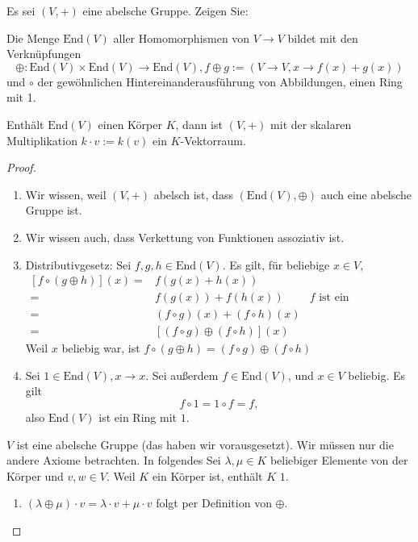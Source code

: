 \begin{Problem}
	Es sei $(V, +)$ eine abelsche Gruppe. Zeigen Sie:
	\begin{parts}
	\item Die Menge $\text{End}\left(V \right) $ aller Homomorphismen von $V\to V$ bildet mit den Verknüpfungen 
		\[
			\oplus: \text{End}(V)\times \text{End}(V)\to \text{End}(V), f\oplus g:=(V\to V, x\to f(x)+g(x))
		\]
		und $\circ$ der gewöhnlichen Hintereinanderausführung von Abbildungen, einen Ring mit 1.
	\item Enthält $\text{End}(V)$ einen Körper $K$, dann ist $(V,+)$ mit der skalaren Multiplikation $k\cdot v:=k(v)$ ein $K$-Vektorraum.
	\end{parts}
\end{Problem}
\begin{proof}
	\begin{parts}
	\item 
		\begin{enumerate}[label=(\roman*)]
			\item Wir wissen, weil $(V,+)$ abelsch ist, dass $(\text{End}(V),\oplus)$ auch eine abelsche Gruppe ist.
			\item Wir wissen auch, dass Verkettung von Funktionen assoziativ ist.
			\item Distributivgesetz: Sei $f,g,h\in \text{End}(V)$. Es gilt, f\"{u}r beliebige $x\in V$,
				\begin{align*}
					\left[f\circ (g\oplus h)\right](x)=& f(g(x)+h(x))\\
					=& f(g(x))+f(h(x)) & f\text{ ist ein Homomorphismus}\\
					=& (f\circ g)(x)+(f\circ h)(x)\\
					=&\left[ (f\circ g)\oplus (f\circ h) \right](x)
				\end{align*}
				Weil $x$ beliebig war, ist $f\circ (g\oplus h)=(f\circ g)\oplus(f\circ h)$
			\item Sei $1\in \text{End}(V), x\to x$. Sei außerdem $f\in \text{End}(V)$, und $x\in V$ beliebig. Es gilt
\[
f\circ 1=1\circ f =f
,\]
also $\text{End}(V)$ ist ein Ring mit $1$.
		\end{enumerate}
	\item $V$ ist eine abelsche Gruppe (das haben wir vorausgesetzt). Wir müssen nur die andere Axiome betrachten. In folgendes Sei $\lambda,\mu\in K$ beliebiger Elemente von der Körper und $v,w\in V$. Weil $K$ ein Körper ist, enthält $K$ $1$. 
		 \begin{enumerate}[label=(\roman*)]
			 \item $(\lambda \oplus \mu)\cdot v=\lambda\cdot v+\mu \cdot v$ folgt per Definition von $\oplus$.

\end{enumerate}
\end{parts}
\end{proof}
